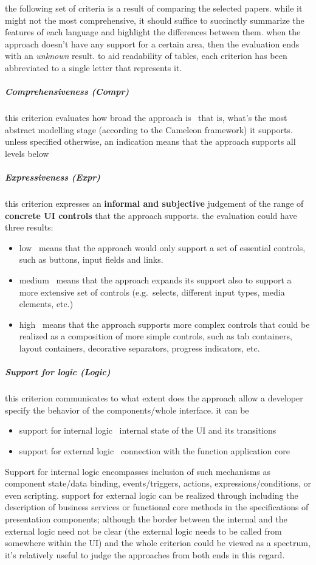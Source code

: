 the following set of criteria is a result of comparing the selected papers.
while it might not the most comprehensive, it should suffice to succinctly summarize the features of each language and highlight the differences between them.
when the approach doesn't have any support for a certain area, then the evaluation ends with an \emph{unknown} result.
to aid readability of tables, each criterion has been abbreviated to a single letter that represents it.


\subparagraph{Comprehensiveness (Compr)}
this criterion evaluates how broad the approach is \textemdash\ that is, what's the most abstract modelling stage (according to the Cameleon framework) it supports.
unless specified otherwise, an indication means that the approach supports all levels below

\subparagraph{Expressiveness (Expr)}
this criterion expresses an \textbf{informal and subjective} judgement of the range of \textbf{concrete UI controls} that the approach supports.
the evaluation could have three results:
\begin{itemize}
    \item low \textemdash\ means that the approach would only support a set of essential controls, such as buttons, input fields and links.
    \item medium \textemdash\ means that the approach expands its support also to support a more extensive set of controls (e.g.\ selects, different input types, media elements, etc.)
    \item high \textemdash\ means that the approach supports more complex controls that could be realized as a composition of more simple controls, such as tab containers, layout containers, decorative separators, progress indicators, etc.
\end{itemize}

\subparagraph{Support for logic (Logic)}
this criterion communicates to what extent does the approach allow a developer specify the behavior of the components/whole interface.
it can be
\begin{itemize}
    \item support for internal logic \textemdash\ internal state of the UI and its transitions
    \item support for external logic \textemdash\ connection with the function application core
\end{itemize}
Support for internal logic encompasses inclusion of such mechanisms as component state/data binding, events/triggers, actions, expressions/conditions, or even scripting.
support for external logic can be realized through including the description of business services or functional core methods in the specifications of presentation components;
although the border between the internal and the external logic need not be clear (the external logic needs to be called from somewhere within the UI) and the whole criterion could be viewed as a spectrum, it's relatively useful to judge the approaches from both ends in this regard.


